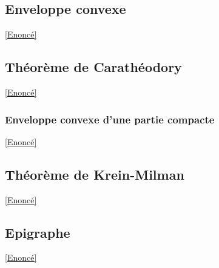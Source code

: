 \documentclass{book}
\begin{document}
	\subsection{Enveloppe convexe}\label{sec:enveloppe-convexe}
	\textcolor{blue}{\hyperref[Enveloppe convexe]{[Enoncé]}}\\
	
	\subsection{Théorème de Carathéodory }
	\label{sec:theoreme-de-caratheodory}
	\textcolor{blue}{\hyperref[Théorème de Carathéodory]{[Enoncé]}}\\
	
	\subsubsection{Enveloppe convexe d'une partie compacte }
	\label{sec-enveloppe-convexe-d'une-partie-compacte}
	\textcolor{blue}{\hyperref[Enveloppe convexe d'une partie compacte]{[Enoncé]}}
	
	\subsection{Théorème de Krein-Milman}
	\label{sec:theoreme-de-krein-milman}
	\textcolor{blue}{\hyperref[Théorème de Krein-Milman]{[Enoncé]}}\\
	
	\subsection{Epigraphe }
	\label{sec:epigraphe}
	\textcolor{blue}{\hyperref[Epigraphe]{[Enoncé]}}\\
	
\end{document}
